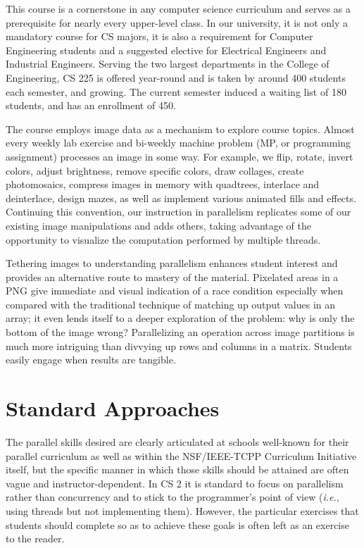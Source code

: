 \documentclass[conference]{./IEEEtran}
\begin{document}
This course is a cornerstone in any computer science curriculum and serves as a
prerequisite for nearly every upper-level class. In our university, it is not
only a mandatory course for CS majors, it is also a requirement for Computer
Engineering students and a suggested elective for Electrical Engineers and
Industrial Engineers. Serving the two largest departments in the College of
Engineering, CS 225 is offered year-round and is taken by around 400 students
each semester, and growing. The current semester induced a waiting list of 180
students, and has an enrollment of 450.

The course employs image data as a mechanism to explore course topics. Almost
every weekly lab exercise and bi-weekly machine problem (MP, or programming
assignment) processes an image in some way. For example, we flip, rotate, invert
colors, adjust brightness, remove specific colors, draw collages, create
photomosaics, compress images in memory with quadtrees, interlace and
deinterlace, design mazes, as well as implement various animated fills and
effects. Continuing this convention, our instruction in parallelism replicates
some of our existing image manipulations and adds others, taking advantage of
the opportunity to visualize the computation performed by multiple threads. 

Tethering images to understanding parallelism enhances student interest and
provides an alternative route to mastery of the material. Pixelated areas in a
PNG give immediate and visual indication of  a race condition especially when
compared with the traditional technique of  matching up output values in an
array; it even lends itself to a deeper exploration of the problem: why is only
the bottom of the image wrong? Parallelizing an operation across image
partitions is much more intriguing than divvying up rows and columns in a
matrix.  Students easily engage when results are tangible.

\section{Standard Approaches}

The parallel skills desired are clearly articulated at schools well-known for
their parallel curriculum \cite{grossman:2012}\cite{bryant:2010} as well as
within  the NSF/IEEE-TCPP Curriculum Initiative itself\cite{tcpp:2013}, but the
specific manner in which those skills should be attained  are  often vague and
instructor-dependent. In CS 2 it is standard to focus on parallelism rather than
concurrency and to stick  to the programmer's point of view (\emph{i.e.}, using
threads but not implementing them).  However, the particular exercises that
students should complete so as to achieve these goals is often left as an
exercise to the reader.
\end{document}
